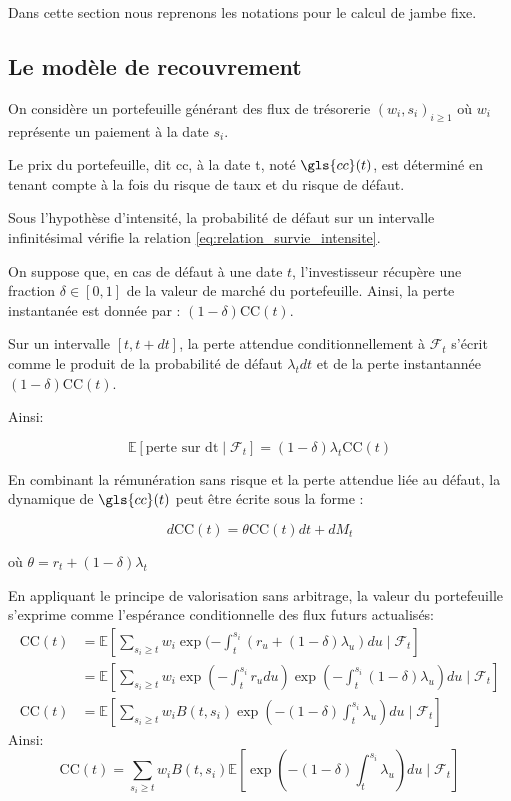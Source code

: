 Dans cette section nous reprenons les notations pour le calcul de jambe fixe.


\subsection{Le modèle de recouvrement}

On considère un portefeuille générant des flux de trésorerie ${(w_i, s_i)}_{i \ge 1}$ où $w_i$ représente un paiement à la date $s_i$.

Le prix du portefeuille, dit \gls{cc}, à la date t, noté $\gls{cc}(t)$, est déterminé en tenant compte à la fois du risque de taux et du risque de défaut.

Sous l’hypothèse d’intensité, la probabilité de défaut sur un intervalle infinitésimal vérifie la relation \ref{eq:relation_survie_intensite}.

On suppose que, en cas de défaut à une date $t$, l’investisseur récupère une fraction $\delta \in [0, 1]$ de la valeur de marché du portefeuille. Ainsi, la perte instantanée est donnée par : $(1 - \delta)\mathrm{CC}(t)$.

Sur un intervalle $[t, t + dt]$, la perte attendue conditionnellement à $\mathcal{F}_t$ s’écrit comme le produit de la probabilité de défaut $\lambda_t dt$ et de la perte instantannée $(1 - \delta)\mathrm{CC}(t)$.

Ainsi:

$$ \mathbb{E}[\text{perte sur dt} \mid \mathcal{F}_t] = (1 - \delta) \lambda_t \mathrm{CC}(t)$$

En combinant la rémunération sans risque et la perte attendue liée au défaut, la dynamique de $\gls{cc}(t)$ peut être écrite sous la forme :

$$ d\mathrm{CC}(t) = \theta \mathrm{CC}(t) dt + dM_t $$

où $\theta = r_t + (1 - \delta)\lambda_t$

En appliquant le principe de valorisation sans arbitrage, la valeur du portefeuille s’exprime comme l’espérance conditionnelle des flux futurs actualisés:
\begin{align*}
    \mathrm{CC}(t) &= \mathbb{E}[\sum_{s_i \ge t} w_i \exp(-\int_t^{s_i}(r_u + (1 - \delta) \lambda_u)du \mid \mathcal{F}_t] \\
    &= \mathbb{E}[\sum_{s_i \ge t} w_i \exp(-\int_t^{s_i} r_u du) \exp(-\int_t^{s_i}(1 - \delta) \lambda_u)du \mid \mathcal{F}_t] \\
    \mathrm{CC}(t) &= \mathbb{E}[\sum_{s_i \ge t} w_i B(t, s_i) \exp(-(1 - \delta)\int_t^{s_i} \lambda_u)du \mid \mathcal{F}_t]
\end{align*}
Ainsi:
\begin{equation}
    \mathrm{CC}(t) = \sum_{s_i \ge t} w_i B(t, s_i) \mathbb{E}[\exp(-(1 - \delta)\int_t^{s_i} \lambda_u)du \mid \mathcal{F}_t]
    \label{eq:prix_portefeuil}
\end{equation}


